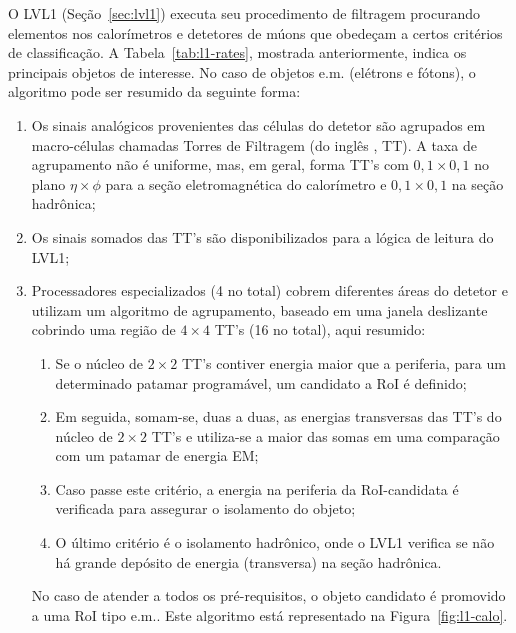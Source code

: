 O LVL1 (Seção~\ref{sec:lvl1}) executa seu procedimento de filtragem procurando
elementos nos calorímetros e detetores de múons que obedeçam a certos
critérios de classificação. A Tabela~\ref{tab:l1-rates}, mostrada
anteriormente, indica os principais objetos de interesse. No caso de objetos
e.m. (elétrons e fótons), o algoritmo pode ser resumido da seguinte forma:

\begin{enumerate}
\item Os sinais analógicos provenientes das células do detetor são agrupados
em macro-células chamadas Torres de Filtragem (do inglês ,
TT). A taxa de agrupamento não é uniforme, mas, em geral, forma TT's com
$0,1\times0,1$ no plano $\eta\times\phi$ para a seção eletromagnética do
calorímetro e $0,1\times0,1$ na seção hadrônica;

\item Os sinais somados das TT's são disponibilizados para a
lógica de leitura do LVL1;

\item Processadores especializados (4 no total) cobrem diferentes áreas do
detetor e utilizam um algoritmo de agrupamento, baseado em uma janela
deslizante \cite{l1-tdr} cobrindo uma região de $4\times4$ TT's (16 no
total), aqui resumido:

\begin{enumerate}
\item Se o núcleo de $2\times2$ TT's contiver energia maior que a
periferia, para um determinado patamar programável, um candidato a RoI é
definido;

\item Em seguida, somam-se, duas a duas, as energias transversas das TT's do
núcleo de $2\times2$ TT's e utiliza-se a maior das somas em uma comparação com
um patamar de energia EM;

\item Caso passe este critério, a energia na periferia da RoI-candidata é
verificada para assegurar o isolamento do objeto; 

\item O último critério é o isolamento hadrônico, onde o LVL1 verifica se não
há grande depósito de energia (transversa) na seção hadrônica.
\end{enumerate}  

No caso de atender a todos os pré-requisitos, o objeto candidato é promovido a
uma RoI tipo e.m.. Este algoritmo está representado na
Figura~\ref{fig:l1-calo}.
\end{enumerate}

